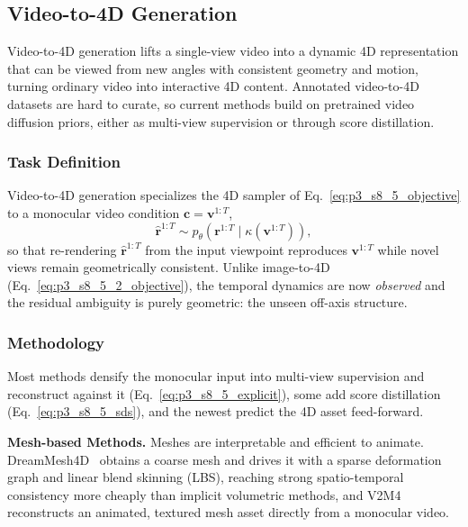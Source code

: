 

\subsection{Video-to-4D Generation}
\label{subsec:p3_s8_5_3}
Video-to-4D generation lifts a single-view video into a dynamic 4D representation that can be viewed from new angles with consistent geometry and motion, turning ordinary video into interactive 4D content. Annotated video-to-4D datasets are hard to curate, so current methods build on pretrained video diffusion priors, either as multi-view supervision or through score distillation.



\subsubsection{Task Definition}
\label{subsubsec:p3_s8_5_3_task}
Video-to-4D generation specializes the 4D sampler of Eq.~\eqref{eq:p3_s8_5_objective} to a monocular video condition $\mathbf{c}=\mathbf{v}^{1:T}$,
\begin{equation}
\label{eq:p3_s8_5_3_objective}
\hat{\mathbf{r}}^{1:T}\sim p_\theta\!\left(\mathbf{r}^{1:T}\mid\kappa(\mathbf{v}^{1:T})\right),
\end{equation}
so that re-rendering $\hat{\mathbf{r}}^{1:T}$ from the input viewpoint reproduces $\mathbf{v}^{1:T}$ while novel views remain geometrically consistent.
Unlike image-to-4D (Eq.~\eqref{eq:p3_s8_5_2_objective}), the temporal dynamics are now \emph{observed} and the residual ambiguity is purely geometric: the unseen off-axis structure.

\subsubsection{Methodology}
\label{subsubsec:p3_s8_5_3_method}
Most methods densify the monocular input into multi-view supervision and reconstruct against it (Eq.~\eqref{eq:p3_s8_5_explicit}), some add score distillation (Eq.~\eqref{eq:p3_s8_5_sds}), and the newest predict the 4D asset feed-forward.

\textbf{Mesh-based Methods.} Meshes are interpretable and efficient to animate. DreamMesh4D~\cite{li2024dreammesh4d} obtains a coarse mesh and drives it with a sparse deformation graph and linear blend skinning (LBS), reaching strong spatio-temporal consistency more cheaply than implicit volumetric methods, and V2M4~\cite{chen2025v2m4} reconstructs an animated, textured mesh asset directly from a monocular video.

